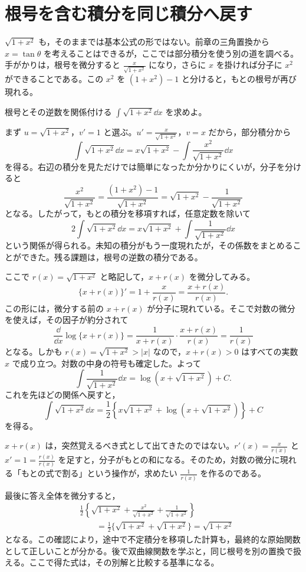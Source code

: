 \section{根号を含む積分を同じ積分へ戻す}\label{節:平方根と部分積分}

$\sqrt{1+x^2}$ も，そのままでは基本公式の形ではない。前章の三角置換から $x=\tan\theta$ を考えることはできるが，ここでは部分積分を使う別の道を調べる。手がかりは，根号を微分すると $\frac{x}{\sqrt{1+x^2}}$ になり，さらに $x$ を掛ければ分子に $x^2$ ができることである。この $x^2$ を $(1+x^2)-1$ と分けると，もとの根号が再び現れる。

\begin{example}{根号とその逆数を関係付ける}
$\int\sqrt{1+x^2}\dd x$ を求めよ。
\end{example}

まず $u=\sqrt{1+x^2}$，$v'=1$ と選ぶ。$u'=\frac{x}{\sqrt{1+x^2}}$，$v=x$ だから，部分積分から
\[
 \int\sqrt{1+x^2}\dd x
 =x\sqrt{1+x^2}-\int\frac{x^2}{\sqrt{1+x^2}}\dd x
\]
を得る。右辺の積分を見ただけでは簡単になったか分かりにくいが，分子を分けると
\[
 \frac{x^2}{\sqrt{1+x^2}}
 =\frac{(1+x^2)-1}{\sqrt{1+x^2}}
 =\sqrt{1+x^2}-\frac1{\sqrt{1+x^2}}
\]
となる。したがって，もとの積分を移項すれば，任意定数を除いて
\[
 2\int\sqrt{1+x^2}\dd x
 =x\sqrt{1+x^2}+\int\frac1{\sqrt{1+x^2}}\dd x
\]
という関係が得られる。未知の積分がもう一度現れたが，その係数をまとめることができた。残る課題は，根号の逆数の積分である。

ここで $r(x)=\sqrt{1+x^2}$ と略記して，$x+r(x)$ を微分してみる。
\[
 \{x+r(x)\}'=1+\frac{x}{r(x)}
 =\frac{x+r(x)}{r(x)}.
\]
この形には，微分する前の $x+r(x)$ が分子に現れている。そこで対数の微分を使えば，その因子が約分されて
\[
 \frac{\dd}{\dd x}\log\{x+r(x)\}
 =\frac{1}{x+r(x)}\cdot\frac{x+r(x)}{r(x)}
 =\frac1{r(x)}
\]
となる。しかも $r(x)=\sqrt{1+x^2}>|x|$ なので，$x+r(x)>0$ はすべての実数 $x$ で成り立つ。対数の中身の符号も確定した。よって
\[
 \int\frac1{\sqrt{1+x^2}}\dd x
 =\log\left(x+\sqrt{1+x^2}\right)+C.
\]
これを先ほどの関係へ戻すと，
\[
 \boxed{
 \int\sqrt{1+x^2}\dd x
 =\frac12\left\{x\sqrt{1+x^2}
       +\log\left(x+\sqrt{1+x^2}\right)\right\}+C
 }
\]
を得る。

$x+r(x)$ は，突然覚えるべき式として出てきたのではない。$r'(x)=\frac{x}{r(x)}$ と $x'=1=\frac{r(x)}{r(x)}$ を足すと，分子がもとの和になる。そのため，対数の微分に現れる「もとの式で割る」という操作が，求めたい $\frac1{r(x)}$ を作るのである。

最後に答え全体を微分すると，
\[
\begin{aligned}
 &\frac12\left\{\sqrt{1+x^2}
       +\frac{x^2}{\sqrt{1+x^2}}
       +\frac1{\sqrt{1+x^2}}\right\}\\
 &\qquad=\frac12\{\sqrt{1+x^2}+\sqrt{1+x^2}\}
 =\sqrt{1+x^2}
\end{aligned}
\]
となる。この確認により，途中で不定積分を移項した計算も，最終的な原始関数として正しいことが分かる。後で双曲線関数を学ぶと，同じ根号を別の置換で扱える。ここで得た式は，その別解と比較する基準になる。

